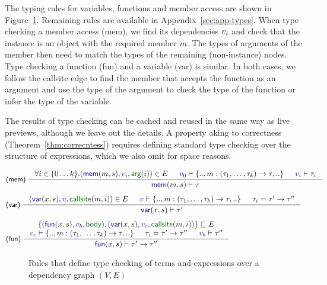 \documentclass[acmsmall,anonymous,fleqn]{acmart}\settopmatter{printfolios=false,printccs=false,printacmref=false}
\theoremstyle{plain}
\theoremstyle{definition}
\newcommand{\bndclr}[1]{\textcolor{kvdclr}{#1}}
\newcommand{\bnd}[1]{\textnormal{\textcolor{kvdclr}{\sffamily #1}}}
\newcommand{\blbl}[1]{\textnormal{\textcolor{numclr}{\sffamily #1}}}
\newcommand{\rname}[1]{{\sffamily\small(#1)}}
\begin{document}
The typing rules for variables, functions and member access are shown in Figure~\ref{fig:tc}.
Remaining rules are available in Appendix~\ref{sec:app-types}.
When type checking a member access \rname{mem}, we find its dependencies $\bndclr{v_i}$ and
check that the instance is an object with the required member $m$. The types of arguments of the
member then need to match the types of the remaining (non-instance) nodes.
Type checking a function \rname{fun} and a variable \rname{var} is similar. In both cases,
we follow the \blbl{callsite} edge to find the member that accepts the function as an argument
and use the type of the argument to check the type of the function or infer the type of the
variable.

The results of type checking can be cached and reused in the same way as live previews, although
we leave out the details. A property aking to correctness (Theorem~\ref{thm:correcntess})
requires defining standard type checking over the structure of expressions, which we also
omit for space reasons.


\begin{figure}
\vspace{-0.5em}
\begin{equation*}
\hspace{-3.5em}
\begin{array}{l}
\inference[\rname{mem}~]
  { \forall i\in\{0\ldots k\}.(\bnd{mem}(m, s), \bndclr{v_i}, \blbl{arg}(i)) \in E &
  \bndclr{v_0} \vdash \{.., m:(\tau_1, \ldots, \tau_k) \rightarrow \tau, ..\} & \bndclr{v_i} \vdash \tau_i }
  { \bnd{mem}(m, s) \vdash \tau }
\\[1.5em]
\inference[\rname{var}~]
  { (\bnd{var}(x,s), \bndclr{v}, \blbl{callsite}(m, i)) \in E &
    \bndclr{v} \vdash \{.., m:(\tau_1, \ldots, \tau_k)\rightarrow \tau,..\} & \tau_i=\tau'\rightarrow\tau'' }
  { \bnd{var}(x, s) \vdash \tau' }
\\[1.5em]
\inference[\rname{fun}~]
  { \{(\bnd{fun}(x,s), \bndclr{v_b}, \blbl{body}), (\bnd{var}(x,s), \bndclr{v_c}, \blbl{callsite}(m, i))\} \subseteq E \\
    \bndclr{v_c} \vdash \{.., m:(\tau_1, \ldots, \tau_k)\rightarrow \tau,..\} &
    \tau_i=\tau'\rightarrow\tau'' & \bndclr{v_b} \vdash \tau'' }
  { \bnd{fun}(x, s) \vdash \tau' \rightarrow \tau'' }
\end{array}
\end{equation*}
\vspace{-0.5em}
\caption{Rules that define type checking of terms and expressions over a dependency graph $(V, E)$}
\label{fig:tc}
\vspace{-0.5em}
\end{figure}
\end{document}
